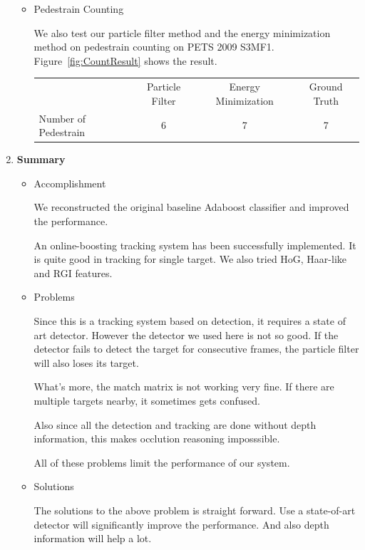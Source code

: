 \documentclass[a4paper]{article}
\begin{document}
\begin{enumerate}
\begin{itemize}
\item Pedestrain Counting

We also test our particle filter method and the energy minimization method on pedestrain counting on PETS 2009 S3MF1. Figure~\ref{fig:CountResult} shows the result.
\begin{center}
\begin{tabular}{l | c | c | c}
\hline
                      & Particle Filter    & Energy Minimization  & Ground Truth \\
Number of Pedestrain  &   6                &  7                   &  7           \\
\hline
\end{tabular}
\end{center}

\end{itemize}

\item \textbf{Summary}

\begin{itemize}
\item Accomplishment

We reconstructed the original baseline Adaboost classifier and improved the performance.

An online-boosting tracking system has been successfully implemented. It is quite good in tracking for single target. We also tried HoG, Haar-like and RGI features.

\item Problems

Since this is a tracking system based on detection, it requires a state of art detector. However the detector we used here is not so good. If the detector fails to detect the target for consecutive frames, the particle filter will also loses its target.

What's more, the match matrix is not working very fine. If there are multiple targets nearby, it sometimes gets confused.

Also since all the detection and tracking are done without depth information, this makes occlution reasoning imposssible.

All of these problems limit the performance of our system.

\item Solutions

The solutions to the above problem is straight forward. Use a state-of-art detector will significantly improve the performance. And also depth information will help a lot.

\end{itemize}



\end{enumerate}

\clearpage


\end{document}
